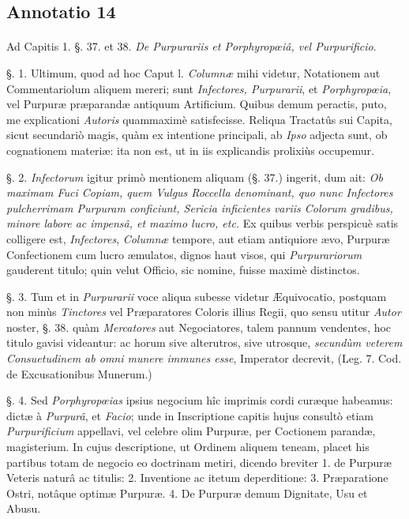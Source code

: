 \documentclass[a4paper, 11pt, oneside, polutonikogreek, german]{article}
\begin{document}
\subsection{Annotatio 14}
\paragraph{}
Ad Capitis 1. §. 37. et 38. \emph{De Purpurariis et Porphyropœiâ, vel Purpurificio}.

§. 1. Ultimum, quod ad hoc Caput l. \emph{Columnæ} mihi videtur, Notationem aut Commentariolum aliquem mereri; sunt \emph{Infectores, Purpurarii}, et \emph{Porphyropœia}, vel Purpuræ præparandæ antiquum Artificium. Quibus demum peractis, puto, me explicationi \emph{Autoris} quammaximè satisfecisse. Reliqua Tractatûs sui Capita, sicut secundariò magis, quàm ex intentione principali, ab \emph{Ipso} adjecta sunt, ob cognationem materiæ: ita non est, ut in iis explicandis prolixiùs occupemur.

§. 2. \emph{Infectorum} igitur primò mentionem aliquam (§. 37.) ingerit, dum ait: \emph{Ob maximam Fuci Copiam, quem Vulgus Roccella denominant, quo nunc Infectores pulcherrimam Purpuram conficiunt, Sericia inficientes variis Colorum gradibus, minore labore ac impensâ, et maximo lucro, etc.} Ex quibus verbis perspicuè satis colligere est, \emph{Infectores}, \emph{Columnæ} tempore, aut etiam antiquiore ævo, Purpuræ Confectionem cum lucro æmulatos, dignos haut visos, qui \emph{Purpurariorum} gauderent titulo; quin velut Officio, sic nomine, fuisse maximè distinctos.

§. 3. Tum et in \emph{Purpurarii} voce aliqua subesse videtur Æquivocatio, postquam non minùs \emph{Tinctores} vel Præparatores Coloris illius Regii, quo sensu utitur \emph{Autor} noster, §. 38. quàm \emph{Mercatores} aut Negociatores, talem pannum vendentes, hoc titulo gavisi videantur: ac horum sive alterutros, sive utrosque, \emph{secundùm veterem Consuetudinem ab omni munere immunes esse}, Imperator decrevit, (Leg. 7. Cod. de Excusationibus Munerum.)

§. 4. Sed \emph{Porphyropœias} ipsius negocium hîc imprimis cordi curæque habeamus: dictæ à \emph{Purpurâ}, et \emph{Facio}; unde in Inscriptione capitis hujus consultò etiam \emph{Purpurificium} appellavi, vel celebre olim Purpuræ, per Coctionem parandæ, magisterium. In cujus descriptione, ut Ordinem aliquem teneam, placet his partibus totam de negocio eo doctrinam metiri, dicendo breviter 1. de Purpuræ Veteris naturâ ac titulis: 2. Inventione ac itetum deperditione: 3. Præparatione Ostri, notâque optimæ Purpuræ. 4. De Purpuræ demum Dignitate, Usu et Abusu.
\end{document}
